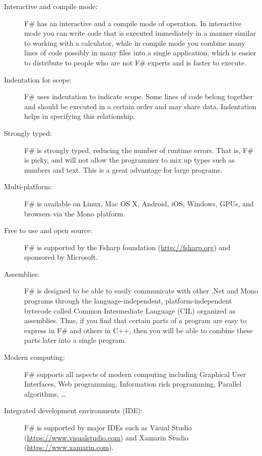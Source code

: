 \begin{description}
\item[Interactive and compile mode:] F\# has an interactive and a compile mode of operation. In interactive mode you can write code that is executed immediately in a manner similar to working with a calculator, while in compile mode you combine many lines of code possibly in many files into a single application, which is easier to distribute to people who are not F\# experts and is faster to execute.
\item[Indentation for scope:] F\# uses indentation to indicate scope. Some lines of code belong together and should be executed in a certain order and may share data. Indentation helps in specifying this relationship.
\item[Strongly typed:] F\# is strongly typed, reducing the number of runtime errors. That is, F\# is picky, and will not allow the programmer to mix up types such as numbers and text. This is a great advantage for large programs.
\item[Multi-platform:] F\# is available on Linux, Mac OS X, Android, iOS, Windows, GPUs, and browsers via the Mono platform.
\item[Free to use and open source:] F\# is supported by the Fsharp foundation (\url{http://fsharp.org}) and sponsored by Microsoft.
\item[Assemblies:] F\# is designed to be able to easily communicate with other .Net and Mono programs through the language-independent, platform-independent bytecode called Common Intermediate Language (CIL) organized as assemblies. Thus, if you find that certain parts of a program are easy to express in F\# and others in C++, then you will be able to combine these parts later into a single program.
\item[Modern computing:] F\# supports all aspects of modern computing including Graphical User Interfaces, Web programming, Information rich programming, Parallel algorithms, \dots
\item[Integrated development environments (IDE):] F\# is supported by major IDEs such as Visual Studio (\url{https://www.visualstudio.com}) and Xamarin Studio (\url{https://www.xamarin.com}).
\end{description}

